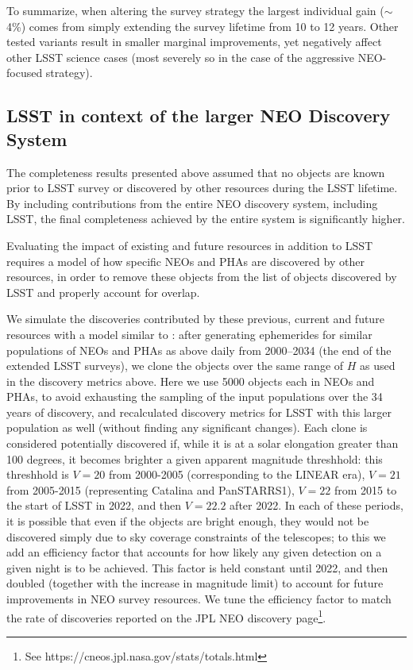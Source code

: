 To summarize, when altering the survey strategy the largest individual gain ($\sim$4\%) comes from simply extending the survey lifetime from 10 to 12 years. Other tested variants result in smaller marginal improvements, yet negatively affect other LSST science cases (most severely so in the case of the aggressive NEO-focused strategy).

\subsection{LSST in context of the larger NEO Discovery System\label{sec:known}}

The completeness results presented above assumed that no objects are known prior to LSST survey or 
discovered by other resources during the LSST lifetime. By including contributions from the entire NEO 
discovery system, including LSST, the final completeness achieved by the entire system is significantly higher.

Evaluating the impact of existing and future resources in addition to LSST requires a model of how 
specific NEOs and PHAs are discovered by other resources, in order to remove these objects
from the list of objects discovered by LSST and properly account for overlap. 

We simulate the discoveries contributed by these previous, current and future resources 
with a model similar to \citet{VeresChesley2017neo}: 
after generating ephemerides for similar populations of NEOs and PHAs as above daily from 2000--2034 
(the end of the extended LSST surveys), we clone the objects over the same range of $H$ as 
used in the discovery metrics above. Here we use 5000 objects each in NEOs and PHAs, to avoid
exhausting the sampling of the input populations over the 34 years of discovery, and recalculated 
discovery metrics for LSST with this larger population as well (without finding any significant changes). 
Each clone is considered potentially discovered if, while it is at
a solar elongation greater than 100 degrees, it becomes brighter a given apparent magnitude threshhold: 
this threshhold is $V=20$ from 2000-2005 (corresponding to the LINEAR era), $V=21$ from 2005-2015 
(representing Catalina and PanSTARRS1), $V=22$ from 2015 to the start of LSST in 2022, and then
$V=22.2$ after 2022.  In each of these periods, it is possible that even if the objects are bright enough, 
they would not be discovered simply due to sky coverage constraints of the telescopes; to 
this we add an efficiency factor that accounts for how likely any given detection on a given night is to be achieved. 
This factor is held constant until 2022, and then doubled (together with the increase in magnitude 
limit) to account for future improvements in NEO survey resources. We tune the efficiency factor to match
the rate of discoveries reported on the JPL NEO discovery page\footnote{See https://cneos.jpl.nasa.gov/stats/totals.html}.

